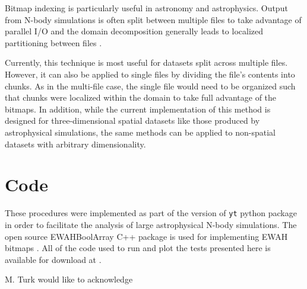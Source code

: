 \documentclass[apjl]{emulateapj}
\newcommand{\todo}[1]{{\color{red}{#1}}}
\begin{document}
Bitmap indexing is particularly useful in astronomy and astrophysics. Output from N-body simulations is often split between multiple files to take advantage of parallel I/O and the domain decomposition generally leads to localized partitioning between files \citep{Springel2001,Springel2005b,Hopkins2015}. \todo{applications outside astronomy}

Currently, this technique is most useful for datasets split across multiple files. However, it can also be applied to single files by dividing the file's contents into chunks. As in the multi-file case, the single file would need to be organized such that chunks were localized within the domain to take full advantage of the bitmaps. In addition, while the current implementation of this method is designed for three-dimensional spatial datasets like those produced by astrophysical simulations, the same methods can be applied to non-spatial datasets with arbitrary dimensionality.

\section{Code}\label{S:code}
These procedures were implemented as part of the \todo{X.X} version of {\tt yt} python package \citep{Turk20d11a} in order to facilitate the analysis of large astrophysical N-body simulations. The open source EWAHBoolArray C++ package is used for implementing EWAH bitmaps \citep{Lemire2010,Kaser2016}. All of the code used to run and plot the tests presented here is available for download at \todo{website}.

\acknowledgments
M. Turk would like to acknowledge \todo{grants, people, places}

\ifdraft
	
\else
	
\fi

\ifplacefig
\else
\fi

\newpage
\todo{To do:
\begin{itemize}
\item Improve conclusion
\item Acknowledgements
\item Plot mem vs index order
\item Move figures to the end for submission
\end{itemize}
}
\end{document}
